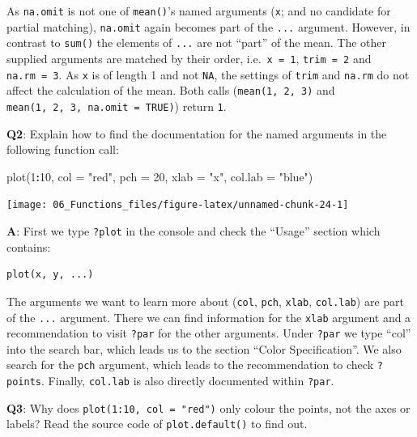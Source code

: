 \documentclass[
]{krantz}
\makeatletter
\newenvironment{Shaded}{\begin{snugshade}}{\end{snugshade}}
\newcommand{\DataTypeTok}[1]{\textcolor[rgb]{0.13,0.29,0.53}{#1}}
\newcommand{\DecValTok}[1]{\textcolor[rgb]{0.00,0.00,0.81}{#1}}
\newcommand{\KeywordTok}[1]{\textcolor[rgb]{0.13,0.29,0.53}{\textbf{#1}}}
\newcommand{\NormalTok}[1]{#1}
\newcommand{\OperatorTok}[1]{\textcolor[rgb]{0.81,0.36,0.00}{\textbf{#1}}}
\newcommand{\StringTok}[1]{\textcolor[rgb]{0.31,0.60,0.02}{#1}}
\newenvironment{kframe}{%
\medskip{}
\setlength{\fboxsep}{.8em}
 \def\at@end@of@kframe{}%
 \ifinner\ifhmode%
  \def\at@end@of@kframe{\end{minipage}}%
  \begin{minipage}{\columnwidth}%
 \fi\fi%
 \def\FrameCommand##1{\hskip\@totalleftmargin \hskip-\fboxsep
 \colorbox{shadecolor}{##1}\hskip-\fboxsep
     \hskip-\linewidth \hskip-\@totalleftmargin \hskip\columnwidth}%
 \MakeFramed {\advance\hsize-\width
   \@totalleftmargin\z@ \linewidth\hsize
   \@setminipage}}%
 {\par\unskip\endMakeFramed%
 \at@end@of@kframe}
\renewenvironment{Shaded}{\begin{kframe}}{\end{kframe}}
\renewcommand{\KeywordTok} [1]{\textcolor[rgb]{0.00,0.44,0.13}{{#1}}}
\renewcommand{\DataTypeTok}[1]{\textcolor[rgb]{0.56,0.13,0.00}{{#1}}}
\renewcommand{\DecValTok}  [1]{\textcolor[rgb]{0.25,0.63,0.44}{{#1}}}
\renewcommand{\StringTok}  [1]{\textcolor[rgb]{0.25,0.44,0.63}{{#1}}}
\renewcommand{\NormalTok}  [1]{{#1}}
\makeatother
\begin{document}
As \texttt{na.omit} is not one of \texttt{mean()}'s named arguments (\texttt{x}; and no candidate for partial matching), \texttt{na.omit} again becomes part of the \texttt{...} argument. However, in contrast to \texttt{sum()} the elements of \texttt{...} are not ``part'' of the mean. The other supplied arguments are matched by their order, i.e.~\texttt{x\ =\ 1}, \texttt{trim\ =\ 2} and \texttt{na.rm\ =\ 3}. As \texttt{x} is of length 1 and not \texttt{NA}, the settings of \texttt{trim} and \texttt{na.rm} do not affect the calculation of the mean. Both calls (\texttt{mean(1,\ 2,\ 3)} and \texttt{mean(1,\ 2,\ 3,\ na.omit\ =\ TRUE)}) return \texttt{1}.

\textbf{{Q2}}: Explain how to find the documentation for the named arguments in the following function call:

\begin{Shaded}
\begin{Highlighting}[]
\KeywordTok{plot}\NormalTok{(}\DecValTok{1}\OperatorTok{:}\DecValTok{10}\NormalTok{, }\DataTypeTok{col =} \StringTok{"red"}\NormalTok{, }\DataTypeTok{pch =} \DecValTok{20}\NormalTok{, }\DataTypeTok{xlab =} \StringTok{"x"}\NormalTok{, }\DataTypeTok{col.lab =} \StringTok{"blue"}\NormalTok{)}
\end{Highlighting}
\end{Shaded}

\begin{center}\texttt{[image: 06\_Functions\_files/figure-latex/unnamed-chunk-24-1]} \end{center}

\textbf{{A}}: First we type \texttt{?plot} in the console and check the ``Usage'' section which contains:

\begin{verbatim}
plot(x, y, ...)
\end{verbatim}

The arguments we want to learn more about (\texttt{col}, \texttt{pch}, \texttt{xlab}, \texttt{col.lab}) are part of the \texttt{...} argument. There we can find information for the \texttt{xlab} argument and a recommendation to visit \texttt{?par} for the other arguments. Under \texttt{?par} we type ``col'' into the search bar, which leads us to the section ``Color Specification''. We also search for the \texttt{pch} argument, which leads to the recommendation to check \texttt{?points}. Finally, \texttt{col.lab} is also directly documented within \texttt{?par}.

\textbf{{Q3}}: Why does \texttt{plot(1:10,\ col\ =\ "red")} only colour the points, not the axes or labels? Read the source code of \texttt{plot.default()} to find out.
\end{document}
